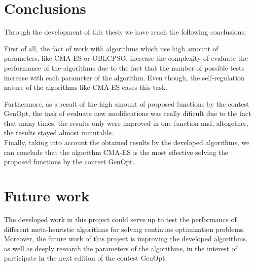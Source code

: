 
\section{Conclusions}

Through the development of this thesis we have reach the following conclusions: 

First of all, the fact of work with algorithms which use high amount of parameters, like CMA-ES or OBLCPSO, increase the complexity of evaluate the performance of the algorithms due to the fact that the number of possible tests increase with each parameter of the algorithm. Even though, the self-regulation nature of the algorithms like CMA-ES eases this task.

Furthermore, as a result of the high amount of proposed functions by the contest GenOpt, the task of evaluate new modifications was really dificult due to the fact that many times, the results only were improved in one function and, altogether, the results stayed almost inmutable. \\

Finally, taking into account the obtained results by the developed algorithms, we can conclude that the algorithm CMA-ES is the most effective solving the proposed functions by the contest GenOpt.



\section{Future work}

The developed work in this project could serve up to test the performance of different meta-heuristic algorithms for solving continuos optimization problems.\\

Moreover, the future work of this project is improving the developed algorithms, as well as deeply research the parameters of the algorithms, in the interest of participate in the next edition of the contest GenOpt.  
